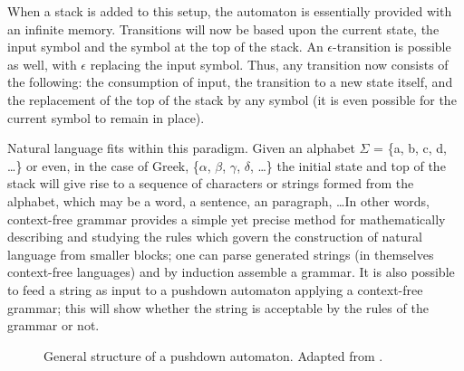 When a stack is added to this setup, the automaton is essentially provided with
an infinite memory. Transitions will now be based upon the current state, the
input symbol and the symbol at the top of the stack. An $\epsilon$-transition
is possible as well, with $\epsilon$ replacing the input symbol. Thus, any
transition now consists of the following: the consumption of input, the
transition to a new state itself, and the replacement of the top of the stack
by any symbol (it is even possible for the current symbol to remain in place).

Natural language fits within this paradigm. Given an alphabet $\Sigma$ = \{a,
b, c, d, \ldots\} or even, in the case of Greek, \{$\alpha$, $\beta$, $\gamma$,
$\delta$, \ldots\} the initial state and top of the stack will give rise to a
sequence of characters or strings formed from the alphabet, which may be a
word, a sentence, an paragraph, \ldots In other words, context-free grammar
provides a simple yet precise method for mathematically describing and studying
the rules which govern the construction of natural language from smaller
blocks; one can parse generated strings (in themselves context-free languages)
and by induction assemble a grammar. It is also possible to feed a string as
input to a pushdown automaton applying a context-free grammar; this will show
whether the string is acceptable by the rules of the grammar or not.

\begin{figure}
  \begin{center}
\end{center}
\caption{General structure of a pushdown automaton. Adapted from \citet[220]{hopcroft2001}.} \label{fig:pushdownautomaton}
\end{figure}


